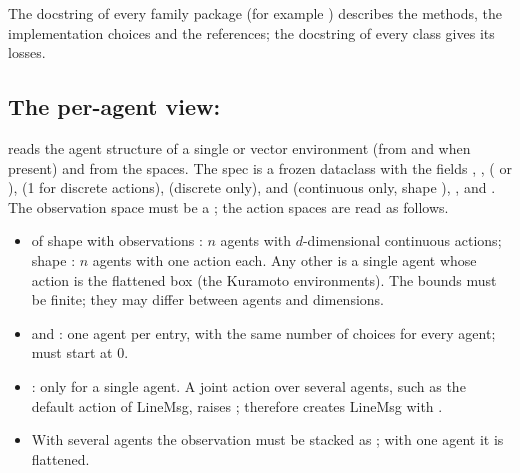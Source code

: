The docstring of every family package (for example
) describes the methods, the
implementation choices and the references; the docstring of every class gives
its losses.

\subsection{The per-agent view: \texorpdfstring{}{MultiAgentSpec}}\label{sec:marl-spec}

 reads the agent structure of a single or
vector environment (from  and
 when present) and
 from the
spaces. The spec is a frozen dataclass with the fields ,
,  ( or
),  (1 for discrete actions),
 (discrete only),  and 
(continuous only, shape ), ,
 and . The observation space must be a
; the action spaces are read as follows.

\begin{itemize}
  \item {} of shape  with observations :
    $n$ agents with $d$-dimensional continuous actions; shape : $n$
    agents with one action each. Any other  is a single agent whose
    action is the flattened box (the Kuramoto environments). The bounds must be
    finite; they may differ between agents and dimensions.
  \item {} and : one agent per entry, with
    the same number of choices for every agent;  must
    start at 0.
  \item {}: only for a single agent. A joint 
    action over several agents, such as the default 
    action of LineMsg, raises ; 
    therefore creates LineMsg with .
  \item With several agents the observation must be stacked as
    ; with one agent it is flattened.
\end{itemize}

